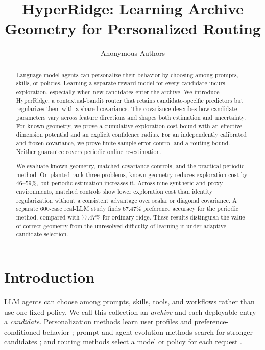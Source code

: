 \documentclass{article} %
\title{HyperRidge: Learning Archive Geometry for Personalized Routing}
\author{Anonymous Authors}
\begin{document}
\allowdisplaybreaks[3]

\maketitle

\begin{abstract}
Language-model agents can personalize their behavior by choosing among
prompts, skills, or policies. Learning a separate reward model for every
candidate incurs exploration, especially when new candidates enter the
archive. We introduce HyperRidge, a contextual-bandit router that retains
candidate-specific predictors but regularizes them with a shared covariance.
The covariance describes how candidate parameters vary across feature
directions and shapes both estimation and uncertainty. For known geometry,
we prove a cumulative exploration-cost bound with an effective-dimension
potential and an explicit confidence radius. For an independently calibrated
and frozen covariance, we prove finite-sample error control and a routing
bound. Neither guarantee covers periodic online re-estimation.

We evaluate known geometry, matched covariance controls, and the practical
periodic method. On planted rank-three problems, known geometry reduces
exploration cost by $46$--$59\%$, but periodic estimation increases it.
Across nine synthetic and proxy environments, matched controls show lower
exploration cost than identity regularization without a consistent advantage
over scalar or diagonal covariance. A separate $600$-case real-LLM study
finds $67.47\%$ preference accuracy for the periodic method, compared with
$77.47\%$ for ordinary ridge. These results distinguish the value of correct
geometry from the unresolved difficulty of learning it under adaptive
candidate selection.
\end{abstract}

\section{Introduction}

\label{sec:intro}

LLM agents can choose among prompts, skills, tools, and workflows rather than use one fixed policy. We call this collection an \emph{archive} and each deployable entry a \emph{candidate}. Personalization methods learn user profiles and preference-conditioned behavior \citep{salemi2023lamp,zhao2025prefeval,jin2026personalizing}; prompt and agent evolution methods search for stronger candidates \citep{fernando2023promptbreeder,guo2024evoprompt,zhou2024symbolic,agrawal2025geparp}; and routing methods select a model or policy for each request \citep{ong2024routellm,hu2024routerbench,li2025llmbandit,tsai2026neuralucb}.
\end{document}
